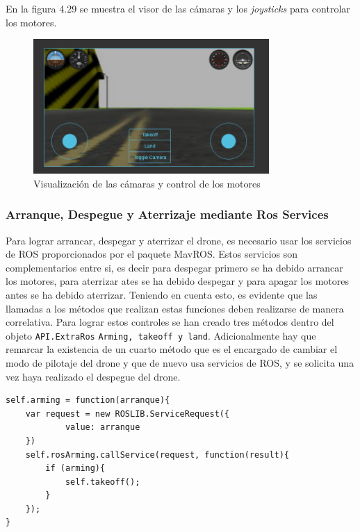 En la figura 4.29 se muestra el visor de las cámaras y los \textit{joysticks} para controlar los motores.

\begin{figure}[H]
  \begin{center}
    \includegraphics[width=0.8\textwidth]{figures/camaradrone.png}
		\caption{Visualización de las cámaras y control de los motores}
		\label{fig.camaradrone}
		\end{center}
\end{figure}

\subsubsection{Arranque, Despegue y Aterrizaje mediante Ros Services}

Para lograr arrancar, despegar y aterrizar el drone, es necesario usar los servicios de ROS proporcionados por el paquete MavROS. Estos servicios son complementarios entre si, es decir para despegar primero se ha debido arrancar los motores, para aterrizar ates se ha debido despegar y para apagar los motores antes se ha debido aterrizar. Teniendo en cuenta esto, es evidente que las llamadas a los métodos que realizan estas funciones deben realizarse de manera correlativa. Para lograr estos controles se han creado tres métodos dentro del objeto \texttt{API.ExtraRos} \texttt{Arming, takeoff y land}. Adicionalmente hay que remarcar la existencia de un cuarto método que es el encargado de cambiar el modo de pilotaje del drone y que de nuevo usa servicios de ROS, y se solicita una vez haya realizado el despegue del drone.

\begin{lstlisting}[caption= Método para arrancar o apagar los motores del drone, label=cod.arming]
self.arming = function(arranque){
	var request = new ROSLIB.ServiceRequest({
			value: arranque
	})
	self.rosArming.callService(request, function(result){
		if (arming){
			self.takeoff();
		} 
	});
}
\end{lstlisting}

